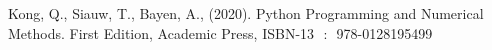 


\takehome




\begin{refenumerate}
\item Kong, Q., Siauw, T., Bayen, A., (2020). Python Programming and Numerical Methods. First Edition, Academic Press,  ISBN-13 ‏ : ‎ 978-0128195499 \\
\end{refenumerate}





%



















%








